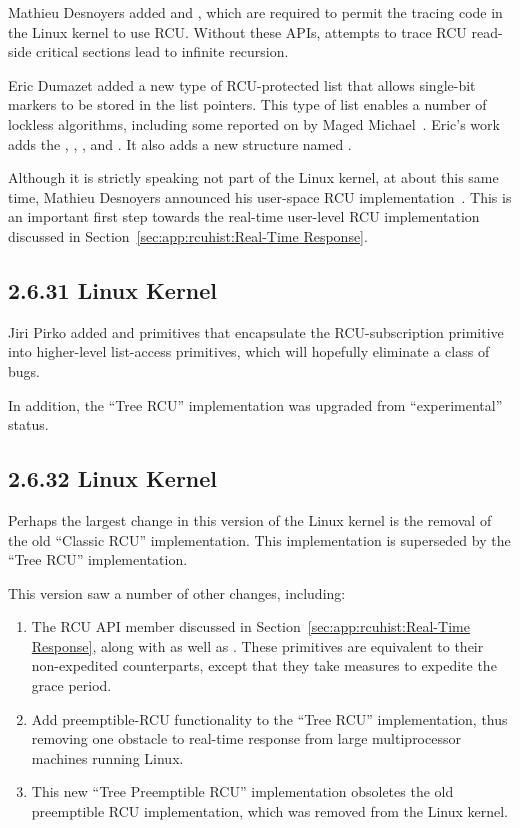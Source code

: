 Mathieu Desnoyers added
 and
,
which are required to permit the tracing code in the Linux kernel
to use RCU.
Without these APIs, attempts to trace RCU read-side critical sections
lead to infinite recursion.

Eric Dumazet added a new type of RCU-protected list that allows single-bit
markers to be stored in the list pointers.
This type of list enables a number of lockless algorithms, including
some reported on by Maged Michael~\cite{MagedMichael04a}.
Eric's work adds the ,
, , and
.
It also adds a new structure named .

Although it is strictly speaking not part of the Linux kernel, 
at about this same time, Mathieu Desnoyers announced his user-space
RCU implementation~\cite{MathieuDesnoyers2009URCU}.
This is an important first step towards the real-time user-level RCU
implementation discussed in
Section~\ref{sec:app:rcuhist:Real-Time Response}.

\subsection{2.6.31 Linux Kernel}

Jiri Pirko added  and 
primitives that encapsulate the  RCU-subscription
primitive into higher-level list-access primitives, which will hopefully
eliminate a class of bugs.

In addition, the ``Tree RCU'' implementation was upgraded from
``experimental'' status.

\subsection{2.6.32 Linux Kernel}

Perhaps the largest change in this version of the Linux kernel
is the removal of the old ``Classic RCU'' implementation.
This implementation is superseded by the ``Tree RCU'' implementation.

This version saw a number of other changes, including:

\begin{enumerate}
\item	The  RCU API member discussed
	in Section~\ref{sec:app:rcuhist:Real-Time Response}, along with
	 as well as
	.
	These primitives are equivalent to their non-expedited
	counterparts, except that they take measures to expedite the
	grace period.
\item	Add preemptible-RCU functionality to the ``Tree RCU''
	implementation, thus removing one obstacle to real-time
	response from large multiprocessor machines running Linux.
\item	This new ``Tree Preemptible RCU'' implementation obsoletes
	the old preemptible RCU implementation, which was removed
	from the Linux kernel.
\end{enumerate}

